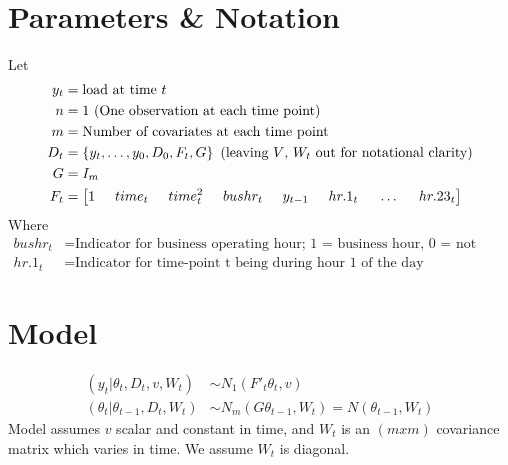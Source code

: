 \documentclass{article}
\title{
\vspace{2in}
\textmd{\textbf{\hmwkTitle}}\\
\normalsize\vspace{0.1in}\small{\hmwkDueDate}\\
\vspace{0.1in}\large{\textit{\hmwkClassInstructor\ }}
\vspace{3in}
}
\author{\textbf{\hmwkAuthorName}}
\date{} %
\begin{document}

%

\newpage
\section{Parameters \& Notation}
Let
\begin{align*}
	y_t &= \text{load at time }t \\
	n &= 1 \text{ (One observation at each time point)}\\
	m &= \text{Number of covariates at each time point}\\
	D_t &= \left\{y_t,\hdots,y_0,D_0,F_t,G \right\} \text{ (leaving $V$, $W_t$ out for notational clarity)}\\
	G &= I_m \\
	F_t &= \left[1 \hspace{.5cm} time_t \hspace{.5cm} time_t^2 \hspace{.5cm} bushr_t \hspace{.5cm}
		 y_{t-1} \hspace{.5cm} hr.1_t \hspace{.5cm} \hdots \hspace{.5cm} hr.23_t \right]
\end{align*}
Where
\begin{align*}
	bushr_t &= \text{Indicator for business operating hour; 1 = business hour, 0 = not business hour}\\
	hr.1_t &= \text{Indicator for time-point t being during hour 1 of the day} 
\end{align*}

\section{Model}
\begin{align*}
	(y_t | \theta_t, D_t,v,W_t) &\sim N_1\left(F'_t\theta_t, v \right)\\
	(\theta_t | \theta_{t-1},D_t,W_t) &\sim N_m\left(G\theta_{t-1},W_t \right) = N\left(\theta_{t-1},W_t \right)
\end{align*}
Model assumes $v$ scalar and constant in time, and $W_t$ is an $(mxm)$ covariance matrix which varies in time.
We assume $W_t$ is diagonal.
\end{document}
